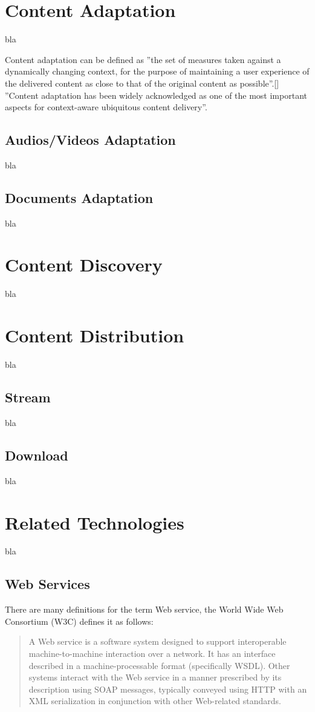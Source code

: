 \section{Content Adaptation\label{sec:back_con_ad}}
bla

Content adaptation can be defined as ''the set of measures taken against a dynamically changing context, for the purpose of maintaining a user experience of the delivered content as close to that of the original content as possible''.[\citeauthor{ieee6040622}]
''Content adaptation has been widely acknowledged as one of the most important aspects for context-aware ubiquitous content delivery''. 

\subsection{Audios/Videos Adaptation}
bla
\subsection{Documents Adaptation}
bla
\section{Content Discovery}
bla
\section{Content Distribution\label{sec:back_con_di}}
bla
\subsection{Stream}
bla
\subsection{Download}
bla	
\section{Related Technologies\label{sec:back_rel_tech}}
bla	
\subsection{Web Services\label{sec:back_tech_ws}}

There are many definitions for the term Web service, the World Wide Web Consortium (W3C) defines it as follows:\cite{W3C}\\
\begin{quote}
A Web service is a software system designed to support interoperable machine-to-machine interaction over a network. It has an interface described in a machine-processable format (specifically WSDL). Other systems interact with the Web service in a manner prescribed by its description using SOAP messages, typically conveyed using HTTP with an XML serialization in conjunction with other Web-related standards.
\end{quote}

